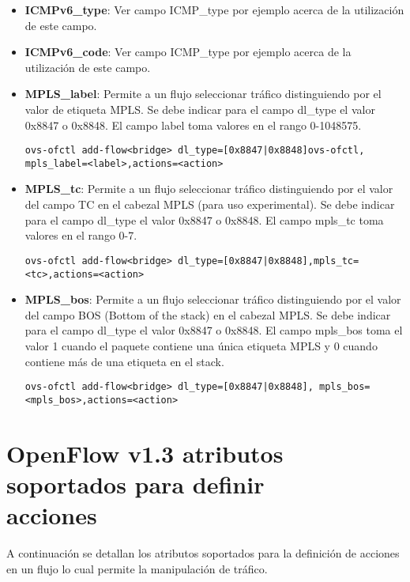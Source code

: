 \begin{itemize}
\item \textbf{ICMPv6\_type}: Ver campo ICMP\_type por ejemplo acerca de la utilización de este campo. 

\item \textbf{ICMPv6\_code}: Ver campo ICMP\_type por ejemplo acerca de la utilización de este campo. 

\item \textbf{MPLS\_label}:  Permite a un flujo seleccionar tr\'afico distinguiendo por el valor de etiqueta MPLS. Se debe indicar para el campo dl\_type el valor 0x8847 o 0x8848. El campo label toma valores en el rango 0-1048575.

\begin{center}
\texttt{ovs-ofctl add-flow<bridge> dl\_type=[0x8847|0x8848]ovs-ofctl, mpls\_label=<label>,actions=<action>}
\end{center}

\item \textbf{MPLS\_tc}: Permite a un flujo seleccionar tr\'afico distinguiendo por el valor del campo TC en el cabezal MPLS (para uso experimental). Se debe indicar para el campo dl\_type el valor 0x8847 o 0x8848. El campo mpls\_tc toma valores en el rango 0-7.

\begin{center}
\texttt{ovs-ofctl add-flow<bridge> dl\_type=[0x8847|0x8848],mpls\_tc=<tc>,actions=<action>}
\end{center}

\item \textbf{MPLS\_bos}: Permite a un flujo seleccionar tr\'afico distinguiendo por el valor del campo BOS (Bottom of the stack) en el cabezal MPLS. Se debe indicar para el campo dl\_type el valor 0x8847 o 0x8848. El campo mpls\_bos toma el valor 1 cuando el paquete contiene una única etiqueta MPLS y 0 cuando contiene m\'as de una etiqueta en el stack.

\begin{center}
\texttt{ovs-ofctl add-flow<bridge> dl\_type=[0x8847|0x8848], mpls\_bos=<mpls\_bos>,actions=<action>}
\end{center}

\end{itemize}

\section{OpenFlow v1.3 atributos soportados para definir \\ acciones}
A continuaci\'on se detallan los atributos soportados para la definici\'on de acciones en un flujo lo cual permite la manipulaci\'on de tr\'afico.

